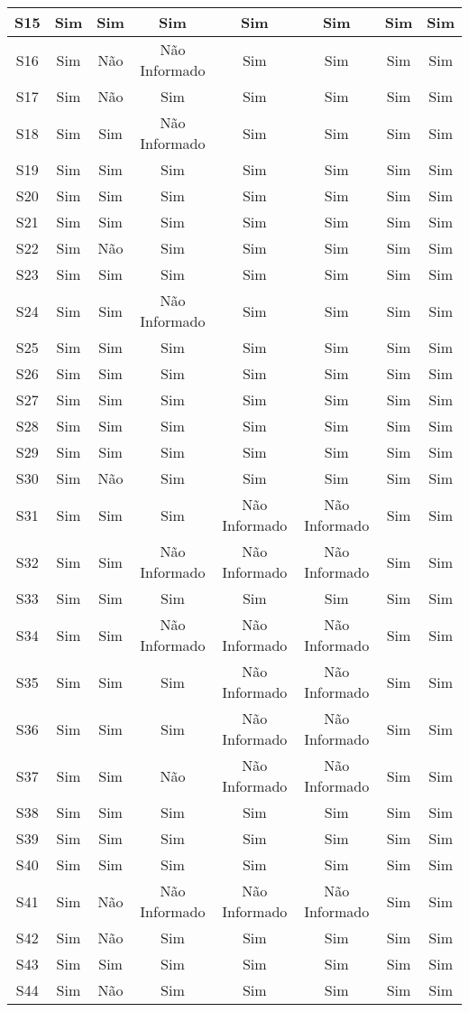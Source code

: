 \begin{landscape}
\begin{longtable}{|c|c|c|c|c|c|c|c|}
		S15 & Sim & Sim & Sim & Sim & Sim & Sim & Sim \\\hline
		S16 & Sim & Não & Não Informado & Sim & Sim & Sim & Sim \\\hline
		S17 & Sim & Não & Sim & Sim & Sim & Sim & Sim \\\hline
		S18 & Sim & Sim & Não Informado & Sim & Sim & Sim & Sim \\\hline
		S19 & Sim & Sim & Sim & Sim & Sim & Sim & Sim \\\hline
		S20 & Sim & Sim & Sim & Sim & Sim & Sim & Sim \\\hline
		S21 & Sim & Sim & Sim & Sim & Sim & Sim & Sim \\\hline
		S22 & Sim & Não & Sim & Sim & Sim & Sim & Sim \\\hline
		S23 & Sim & Sim & Sim & Sim & Sim & Sim & Sim \\\hline
		S24 & Sim & Sim & Não Informado & Sim & Sim & Sim & Sim \\\hline
		S25 & Sim & Sim & Sim & Sim & Sim & Sim & Sim \\\hline
		S26 & Sim & Sim & Sim & Sim & Sim & Sim & Sim \\\hline
		S27 & Sim & Sim & Sim & Sim & Sim & Sim & Sim \\\hline
		S28 & Sim & Sim & Sim & Sim & Sim & Sim & Sim \\\hline
		S29 & Sim & Sim & Sim & Sim & Sim & Sim & Sim \\\hline
		S30 & Sim & Não & Sim & Sim & Sim & Sim & Sim \\\hline
		S31 & Sim & Sim & Sim & Não Informado & Não Informado & Sim & Sim \\\hline
		S32 & Sim & Sim & Não Informado & Não Informado & Não Informado & Sim & Sim \\\hline
		S33 & Sim & Sim & Sim & Sim & Sim & Sim & Sim \\\hline
		S34 & Sim & Sim & Não Informado & Não Informado & Não Informado & Sim & Sim \\\hline
		S35 & Sim & Sim & Sim & Não Informado & Não Informado & Sim & Sim \\\hline
		S36 & Sim & Sim & Sim & Não Informado & Não Informado & Sim & Sim \\\hline
		S37 & Sim & Sim & Não & Não Informado & Não Informado & Sim & Sim \\\hline
		S38 & Sim & Sim & Sim & Sim & Sim & Sim & Sim \\\hline
		S39 & Sim & Sim & Sim & Sim & Sim & Sim & Sim \\\hline
		S40 & Sim & Sim & Sim & Sim & Sim & Sim & Sim \\\hline
		S41 & Sim & Não & Não Informado & Não Informado & Não Informado & Sim & Sim \\\hline
		S42 & Sim & Não & Sim & Sim & Sim & Sim & Sim \\\hline
		S43 & Sim & Sim & Sim & Sim & Sim & Sim & Sim \\\hline
		S44 & Sim & Não & Sim & Sim & Sim & Sim & Sim \\\hline		
	\end{longtable}
\end{landscape}

